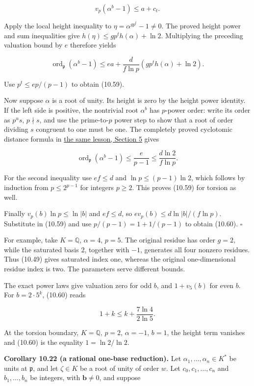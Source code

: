 \documentclass[
  11pt,
  a4paper,
]{article}
\begin{document}
\[
v_p(\alpha^b-1)\le a+c_t.
\]

Apply the local height inequality to \(\eta=\alpha^{gp^t}-1\ne0\). The
proved height power and sum inequalities give
\(h(\eta)\le gp^t h(\alpha)+\ln2\). Multiplying the preceding valuation
bound by \(e\) therefore yields

\[
\operatorname{ord}_{\mathfrak p}(\alpha^b-1)
\le e a+\frac d{f\ln p}
\left(gp^t h(\alpha)+\ln2\right).
\]

Use \(p^t\le ep/(p-1)\) to obtain (10.59).

Now suppose \(\alpha\) is a root of unity. Its height is zero by the
height power identity. If the left side is positive, the nontrivial root
\(\alpha^b\) has \(p\)-power order: write its order as \(p^u s\),
\(p\nmid s\), and use the prime-to-\(p\) power step to show that a root
of order dividing \(s\) congruent to one must be one. The completely
proved cyclotomic distance formula in
\href{../TR-BAKER-09.html\#5-cyclotomic-ramification-and-distances-between-roots}{the
same lesson, Section 5} gives

\[
\operatorname{ord}_{\mathfrak p}(\alpha^b-1)
\le\frac e{p-1}\le\frac{d\ln2}{f\ln p}.
\]

For the second inequality use \(ef\le d\) and \(\ln p\le(p-1)\ln2\),
which follows by induction from \(p\le2^{p-1}\) for integers \(p\ge2\).
This proves (10.59) for torsion as well.

Finally \(v_p(b)\ln p\le\ln|b|\) and \(ef\le d\), so
\(e v_p(b)\le d\ln|b|/(f\ln p)\). Substitute in (10.59) and use
\(p/(p-1)=1+1/(p-1)\) to obtain (10.60). \(\square\)

For example, take \(K=\mathbb Q\), \(\alpha=4\), \(p=5\). The original
residue has order \(g=2\), while the saturated basis \(2\), together
with \(-1\), generates all four nonzero residues. Thus (10.49) gives
saturated index one, whereas the original one-dimensional residue index
is two. The parameters serve different bounds.

The exact power laws give valuation zero for odd \(b\), and \(1+v_5(b)\)
for even \(b\). For \(b=2\cdot5^k\), (10.60) reads

\[
1+k\le k+\frac{7\ln4}{2\ln5}.
\]

At the torsion boundary, \(K=\mathbb Q\), \(p=2\), \(\alpha=-1\),
\(b=1\), the height term vanishes and (10.60) is the equality
\(1=\ln2/\ln2\).

\textbf{Corollary 10.22 (a rational one-base reduction).} Let
\(\alpha_1,\ldots,\alpha_n\in K^*\) be units at \(\mathfrak p\), and let
\(\zeta\in K\) be a root of unity of order \(w\). Let
\(c_0,c_1,\ldots,c_n\) and \(b_1,\ldots,b_n\) be integers, with
\(\boldsymbol b\ne0\), and suppose
\end{document}
